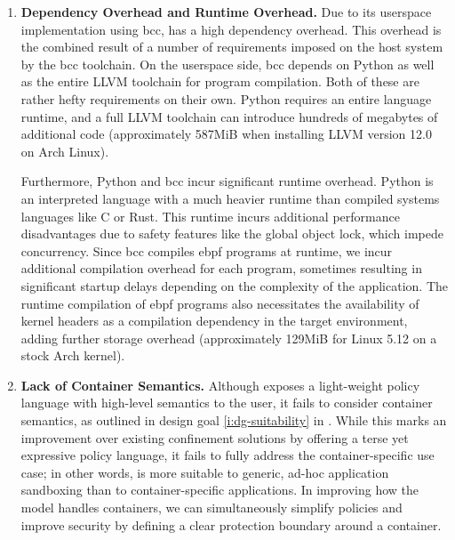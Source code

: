 \begin{enumerate}
  \item \textbf{Dependency Overhead and Runtime Overhead.}
    Due to its userspace implementation using bcc, \bpfbox{} has a high dependency
    overhead. This overhead is the combined result of a number of requirements imposed on
    the host system by the bcc toolchain. On the userspace side, bcc depends on Python as
    well as the entire LLVM toolchain for program compilation. Both of these are rather
    hefty requirements on their own. Python requires an entire language runtime, and
    a full LLVM toolchain can introduce hundreds of megabytes of additional code
    (approximately 587MiB when installing LLVM version 12.0 on Arch Linux).

    Furthermore, Python and bcc incur significant runtime overhead. Python is an
    interpreted language with a much heavier runtime than compiled systems languages like
    C or Rust.  This runtime incurs additional performance disadvantages due to safety
    features like the global object lock, which impede concurrency. Since bcc compiles
    \gls{ebpf} programs at runtime, we incur additional compilation overhead for each
    program, sometimes resulting in significant startup delays depending on the complexity
    of the application. The runtime compilation of \gls{ebpf} programs also necessitates
    the availability of kernel headers as a compilation dependency in the target
    environment, adding further storage overhead (approximately 129MiB for Linux
    5.12 on a stock Arch kernel).

  \item \textbf{Lack of Container Semantics.}
    Although \bpfbox{} exposes a light-weight policy language with high-level semantics to
    the user, it fails to consider container semantics, as outlined in design goal
    \ref{i:dg-suitability} in . While this marks an improvement over
    existing confinement solutions by offering a terse yet expressive policy language, it
    fails to fully address the container-specific use case; in other words, \bpfbox{} is
    more suitable to generic, ad-hoc application sandboxing than to container-specific
    applications. In improving how the \bpfbox{} model handles containers, we can
    simultaneously simplify policies and improve security by defining a clear protection
    boundary around a container.


\end{enumerate}
